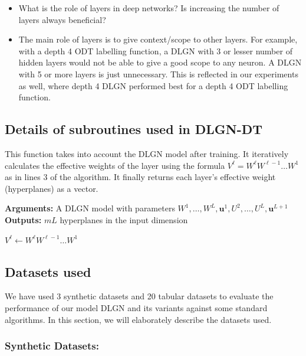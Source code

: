 \documentclass{article} %
\renewcommand{\>}{{\rightarrow}}
\renewcommand{\=}{\stackrel{\triangle}{=}}
\newcommand{\0}{{\mathbf 0}}
\renewcommand{\u}{{\mathbf u}}
\newcommand{\myVar}{\texttt}
\begin{document}
\begin{itemize}
    \item[Q:] What is the role of layers in deep networks? Is increasing the number of layers always beneficial?
    \item[A:] The main role of layers is to give context/scope to other layers. For example, with a depth 4 ODT labelling function, a DLGN with 3 or lesser number of hidden layers would not be able to give a good scope to any neuron. A DLGN with 5 or more layers is just unnecessary. This is reflected in our experiments as well, where depth 4 DLGN performed best for a depth 4 ODT labelling function. 
    
    
\end{itemize}


\subsection{Details of subroutines used in DLGN-DT}

This function takes into account the DLGN model after training. It iteratively calculates the effective weights of the layer using the formula $V^\ell = W^\ell W^{\ell-1} \ldots W^1$ as in lines 3 of the algorithm. It finally returns each layer's effective weight (hyperplanes) as a vector.

\begin{algorithm}[h]
  \caption{Return gates of a trained DLGN model}\label{alg:return_gates}
  \textbf{Arguments:} A DLGN model with parameters $W^1, \ldots, W^L, \u^1, U^2,\ldots,U^L,\u^{L+1}$\\
    \textbf{Outputs:} $mL$ hyperplanes in the input dimension
  \begin{algorithmic}[1]
    \Function{\textsc{GateHyperplanes}}{\myVar{model}}
        \State $V^\ell \gets W^\ell W^{\ell-1} \ldots W^1$ 
        \EndFor
      \State {}
    \EndFunction
  \end{algorithmic}
\end{algorithm}

\subsection{Datasets used}
We have used 3 synthetic datasets and 20 tabular datasets to evaluate the performance of our model DLGN and its variants against some standard algorithms. In this section, we will elaborately describe the datasets used.

\subsubsection{Synthetic Datasets:}
\end{document}
